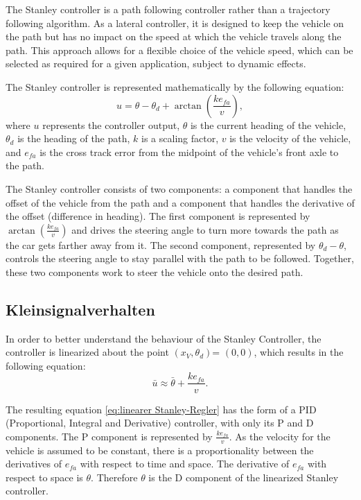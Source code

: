 \documentclass[arbeit=studie,oneside,BCOR=12mm]{ArbeitRST}
\begin{document}
The Stanley controller is a path following controller rather than a trajectory
following algorithm. As a lateral controller, it is designed to keep the
vehicle on the path but has no impact on the speed at which the vehicle travels
along the path. This approach allows for a flexible choice of the vehicle
speed, which can be selected as required for a given application, subject to
dynamic effects.

The Stanley controller is represented mathematically by the following equation:
\begin{equation}
  u = \theta - \theta_d + \arctan\left(\frac{ke_{fa}}{v}\right),
  \label{eq:Stanley-Regler}
\end{equation}
where $u$ represents the controller output, $\theta$ is the current heading of
the vehicle, $\theta_d$ is the heading of the path, $k$ is a scaling factor,
$v$ is the velocity of the vehicle, and $e_{fa}$ is the cross track error from
the midpoint of the vehicle's front axle to the path.

The Stanley controller consists of two components: a component that handles the
offset of the vehicle from the path and a component that handles the derivative
of the offset (difference in heading). The first component is represented by
$\arctan(\frac{ke_{fa}}{v})$ and drives the steering angle to turn more towards
the path as the car gets farther away from it. The second component,
represented by $\theta_d - \theta$, controls the steering angle to stay
parallel with the path to be followed. Together, these two components work to
steer the vehicle onto the desired path.

\subsection{Kleinsignalverhalten}
In order to better understand the behaviour of the Stanley Controller, the
controller is linearized about the point \(\left(x_V, \theta_d\right)\)=
\(\left(0, 0\right)\), which results in the following equation:
\begin{equation}
  \bar{u} \approx \bar{\theta} + \frac{ke_{fa}}{v}.
  \label{eq:linearer Stanley-Regler}
\end{equation}

The resulting equation \eqref{eq:linearer Stanley-Regler} has the form of a PID
(Proportional, Integral and Derivative) controller, with only its P and D
components. The P component is represented by \(\frac{ke_{fa}}{v}\). As the
velocity for the vehicle is assumed to be constant, there is a proportionality
between the derivatives of \(e_{fa}\) with respect to time and space. The
derivative of \(e_{fa}\) with respect to space is \(\theta\). Therefore
\(\theta\) is the D component of the linearized Stanley controller.
\end{document}
